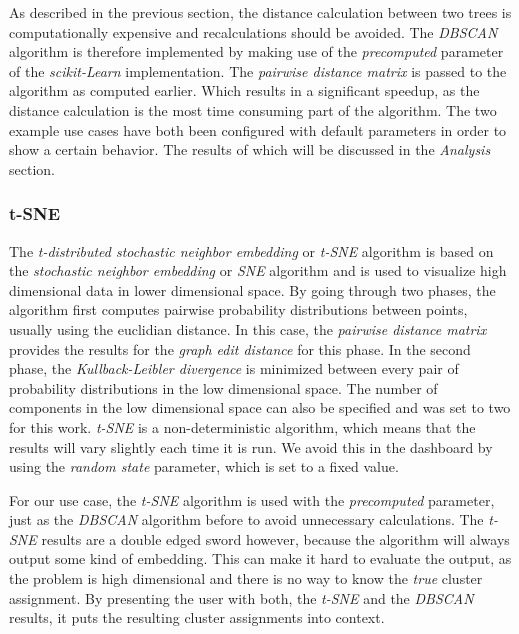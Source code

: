 \documentclass[a4paper, 12pt]{article}
\begin{document}
As described in the previous section, the distance calculation between two trees is computationally
expensive and recalculations should be avoided. The \textit{DBSCAN} algorithm is therefore
implemented by making use of the \textit{precomputed} parameter of the \textit{scikit-Learn}
implementation. The \textit{pairwise distance matrix} is passed to the algorithm as computed
earlier. Which results in a significant speedup, as the distance calculation is the most time
consuming part of the algorithm. The two example use cases have both been configured with default
parameters in order to show a certain behavior. The results of which will be discussed in the
\textit{Analysis} section. \par

\subsubsection{t-SNE}
The \textit{t-distributed stochastic neighbor embedding} or \textit{t-SNE} algorithm is based on
the \textit{stochastic neighbor embedding} or \textit{SNE} \cite{hinton2002stochastic} algorithm
and is used to visualize high dimensional data in lower dimensional space. By going through two
phases, the algorithm first computes pairwise probability distributions between points, usually
using the euclidian distance. In this case, the \textit{pairwise distance matrix} provides the
results for the \textit{graph edit distance} for this phase. In the second phase, the
\textit{Kullback-Leibler divergence} \cite{csiszar1975divergence} is minimized between every pair
of probability distributions in the low dimensional space. The number of components in the low
dimensional space can also be specified and was set to two for this work.
\textit{t-SNE} is a non-deterministic algorithm, which means that the results will vary slightly
each time it is run. We avoid this in the dashboard by using the \textit{random state} parameter,
which is set to a fixed value. \par

For our use case, the \textit{t-SNE} algorithm is used with the \textit{precomputed} parameter,
just as the \textit{DBSCAN} algorithm before to avoid unnecessary calculations.
The \textit{t-SNE} results are a double edged sword however, because the algorithm will always
output some kind of embedding. This can make it hard to evaluate the output, as the problem is
high dimensional and there is no way to know the \textit{true} cluster assignment.
By presenting the user with both, the \textit{t-SNE} and the \textit{DBSCAN} results, it puts the
resulting cluster assignments into context.
\end{document}
